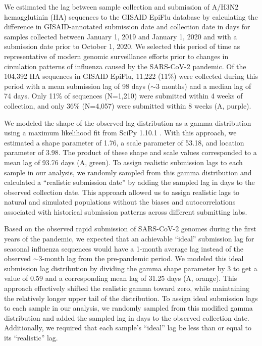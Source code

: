 \documentclass[9pt,lineno]{elife}
\begin{document}
We estimated the lag between sample collection and submission of A/H3N2 hemagglutinin (HA) sequences to the GISAID EpiFlu database \citep{gisaid} by calculating the difference in GISAID-annotated submission date and collection date in days for samples collected between January 1, 2019 and January 1, 2020 and with a submission date prior to October 1, 2020.
We selected this period of time as representative of modern genomic surveillance efforts prior to changes in circulation patterns of influenza caused by the SARS-CoV-2 pandemic.
Of the 104,392 HA sequences in GISAID EpiFlu, 11,222 (11\%) were collected during this period with a mean submission lag of 98 days ($\sim$3 months) and a median lag of 74 days.
Only 11\% of sequences (N=1,210) were submitted within 4 weeks of collection, and only 36\% (N=4,057) were submitted within 8 weeks (A, purple).

We modeled the shape of the observed lag distribution as a gamma distribution using a maximum likelihood fit from SciPy 1.10.1 \citep{scipy}.
With this approach, we estimated a shape parameter of 1.76, a scale parameter of 53.18, and location parameter of 3.98.
The product of these shape and scale values corresponded to a mean lag of 93.76 days (A, green).
To assign realistic submission lags to each sample in our analysis, we randomly sampled from this gamma distribution and calculated a ``realistic submission date'' by adding the sampled lag in days to the observed collection date.
This approach allowed us to assign realistic lags to natural and simulated populations without the biases and autocorrelations associated with historical submission patterns across different submitting labs.

Based on the observed rapid submission of SARS-CoV-2 genomes during the first years of the pandemic, we expected that an achievable ``ideal'' submission lag for seasonal influenza sequences would have a 1-month average lag instead of the observed $\sim$3-month lag from the pre-pandemic period.
We modeled this ideal submission lag distribution by dividing the gamma shape parameter by 3 to get a value of 0.59 and a corresponding mean lag of 31.25 days (A, orange).
This approach effectively shifted the realistic gamma toward zero, while maintaining the relatively longer upper tail of the distribution.
To assign ideal submission lags to each sample in our analysis, we randomly sampled from this modified gamma distribution and added the sampled lag in days to the observed collection date.
Additionally, we required that each sample's ``ideal'' lag be less than or equal to its ``realistic'' lag.
\end{document}
